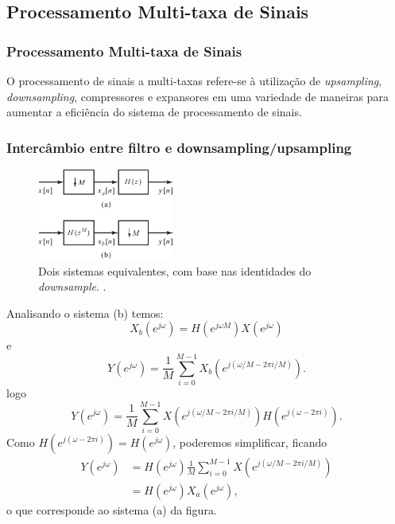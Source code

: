 \subsection{Processamento Multi-taxa de Sinais}
\begin{frame}[allowframebreaks]
  \frametitle{Processamento Multi-taxa de Sinais}
  O processamento de sinais a multi-taxas refere-se à utilização de \textit{upsampling},
  \textit{downsampling}, compressores e expansores em uma variedade de maneiras para
  aumentar a eficiência do sistema de processamento de sinais.
\end{frame}

\begin{frame}[allowframebreaks]
  \frametitle{Intercâmbio entre filtro e downsampling/upsampling}

        \begin{figure}[h!]
        \centering
        \includegraphics[width=0.4\textwidth]{images/fig431.pdf}
        \caption{Dois sistemas equivalentes, com base nas identidades do \textit{downsample}. \citep{oppenheim2009}.}
        \label{fig:fig431}
        \end{figure}

  Analisando o sistema (b) temos:
  \begin{equation}
   X_b(e^{j\omega}) = H(e^{j\omega M}) X(e^{j \omega})
  \end{equation}
  e
  \begin{equation}
   Y(e^{j \omega}) = \frac{1}{M} \sum_{i=0}^{M-1} X_b \left( e^{j (\omega / M - 2\pi i/M)} \right).
  \end{equation}
  logo
  \begin{equation}
   Y(e^{j \omega}) = \frac{1}{M} \sum_{i=0}^{M-1} X\left( e^{j (\omega / M - 2\pi i/M)} \right) H\left( e^{j(\omega - 2\pi i)} \right).
  \end{equation}
  Como $H\left( e^{j(\omega - 2\pi i)} \right) = H(e^{j\omega})$, poderemos simplificar, ficando
  \begin{align}
   Y(e^{j \omega}) &= H(e^{j\omega}) \frac{1}{M} \sum_{i=0}^{M-1} X\left( e^{j (\omega / M - 2\pi i/M)} \right) \\
                &= H(e^{j\omega}) X_a(e^{j\omega}) ,
  \end{align}
  o que corresponde ao sistema (a) da figura.



\end{frame}
